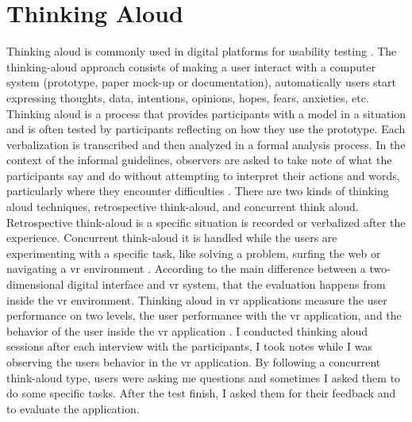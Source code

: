 \section{Thinking Aloud}

Thinking aloud is commonly used in digital platforms for usability testing \citep{VanWaes2000}. The thinking-aloud approach consists of making a user interact with a computer system (prototype, paper mock-up or documentation),  automatically users start expressing thoughts, data, intentions, opinions, hopes, fears, anxieties, etc.  Thinking aloud is a process that provides participants with a model in a situation and is often tested by participants reflecting on how they use the prototype. Each verbalization is transcribed and then analyzed in a formal analysis process. In the context of the informal guidelines, observers are asked to take note of what the participants say and do without attempting to interpret their actions and words, particularly where they encounter difficulties \citep{Jrgensen1990}. There are two kinds of thinking aloud techniques, retrospective think-aloud, and concurrent think aloud. Retrospective think-aloud is a specific situation is recorded or verbalized after the experience. Concurrent think-aloud it is handled while the users are experimenting with a specific task, like solving a problem, surfing the web or navigating a \acrshort{vr} environment \citep{Friedman2004NavigatingSteps}. According to \cite{Marsh1999EvaluationUsability} the main difference between a two-dimensional digital interface and \acrfull{vr} system, that the evaluation happens from inside the \acrshort{vr} environment. Thinking aloud in \acrshort{vr} applications measure the user performance on two levels, the user performance with the \acrshort{vr} application, and the behavior of the user inside the \acrshort{vr} application \citep{Marsh1999EvaluationUsability}. I conducted thinking aloud sessions after each interview with the participants, I
took notes while I was observing the users behavior in the \acrshort{vr} application. By following
a concurrent think-aloud type, users were asking me questions and sometimes I asked
them to do some specific tasks. After the test finish, I asked them for their feedback and
to evaluate the application. 





